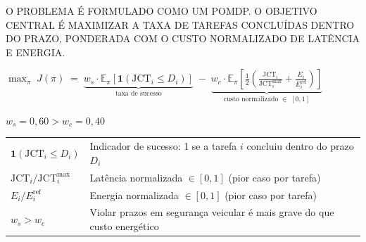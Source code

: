 \documentclass{beamer}
\begin{document}
{
\begin{frame}[plain, t]
\color{black}

\vspace{0.30cm}
\hspace{0.3cm}{\Large\bfseries\ttfamily FORMULAÇÃO DO PROBLEMA}

\vspace{0.20cm}
\hspace{0.3cm}
\begin{minipage}{0.92\textwidth}
{\scriptsize\ttfamily\setlength{\baselineskip}{1.5\baselineskip}
O PROBLEMA É FORMULADO COMO UM POMDP. O OBJETIVO CENTRAL É
MAXIMIZAR A TAXA DE TAREFAS CONCLUÍDAS DENTRO DO PRAZO,
PONDERADA COM O CUSTO NORMALIZADO DE LATÊNCIA E ENERGIA.
}
\end{minipage}

\vspace{0.10cm}
\centering
\begin{minipage}{0.94\textwidth}

\begin{block}{}
\vspace{2pt}
\centering
$\displaystyle
\max_{\pi}\; J(\pi) \;=\;
\underbrace{w_s \cdot \mathbb{E}_\pi\!\left[\mathbf{1}(\text{JCT}_i \leq D_i)\right]}_{\text{taxa de sucesso}}
\;-\;
\underbrace{w_c \cdot \mathbb{E}_\pi\!\left[\frac{1}{2}\!\left(\frac{\text{JCT}_i}{\text{JCT}^{\max}_i} + \frac{E_i}{E^{\text{ref}}_i}\right)\right]}_{\text{custo normalizado} \;\in\;[0,1]}
$
\vspace{4pt}

{\scriptsize\ttfamily $w_s = 0{,}60 > w_c = 0{,}40$}
\vspace{2pt}
\end{block}

\vspace{8pt}
{\scriptsize\ttfamily
\begin{tabular}{@{}p{3.5cm}p{7.2cm}@{}}
$\mathbf{1}(\text{JCT}_i \leq D_i)$ & Indicador de sucesso: 1 se a tarefa $i$ concluiu dentro do prazo $D_i$ \\[3pt]
$\text{JCT}_i / \text{JCT}^{\max}_i$ & Latência normalizada $\in [0,1]$ (pior caso por tarefa) \\[3pt]
$E_i / E^{\text{ref}}_i$ & Energia normalizada $\in [0,1]$ (pior caso por tarefa) \\[3pt]
$w_s > w_c$ & Violar prazos em segurança veicular é mais grave do que custo energético \\
\end{tabular}
}

\end{minipage}

\end{frame}
}
\end{document}
